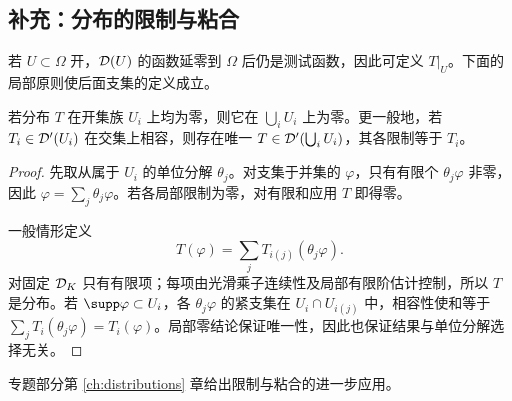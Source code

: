 \subsection{补充：分布的限制与粘合}
若 $U\subset\Omega$ 开，$\mathcal{D}(U)$ 的函数延零到 $\Omega$ 后仍是测试函数，因此可定义 $T|_U$。下面的局部原则使后面支集的定义成立。
\begin{proposition}[分布的局部唯一性与粘合]\label{prop:y1-gluing}
若分布 $T$ 在开集族 $U_i$ 上均为零，则它在 $\bigcup_iU_i$ 上为零。更一般地，若 $T_i\in\mathcal{D}'(U_i)$ 在交集上相容，则存在唯一 $T\in\mathcal{D}'(\bigcup_iU_i)$，其各限制等于 $T_i$。
\end{proposition}
\begin{proof}
先取从属于 $U_i$ 的单位分解 $\theta_j$。对支集于并集的 $\varphi$，只有有限个 $\theta_j\varphi$ 非零，因此 $\varphi=\sum_j\theta_j\varphi$。若各局部限制为零，对有限和应用 $T$ 即得零。

一般情形定义
\[
 T(\varphi)=\sum_jT_{i(j)}(\theta_j\varphi).
\]
对固定 $\mathcal{D}_K$ 只有有限项；每项由光滑乘子连续性及局部有限阶估计控制，所以 $T$ 是分布。若 $\supp\varphi\subset U_i$，各 $\theta_j\varphi$ 的紧支集在 $U_i\cap U_{i(j)}$ 中，相容性使和等于 $\sum_jT_i(\theta_j\varphi)=T_i(\varphi)$。局部零结论保证唯一性，因此也保证结果与单位分解选择无关。
\end{proof}
专题部分第 \ref{ch:distributions} 章给出限制与粘合的进一步应用。
